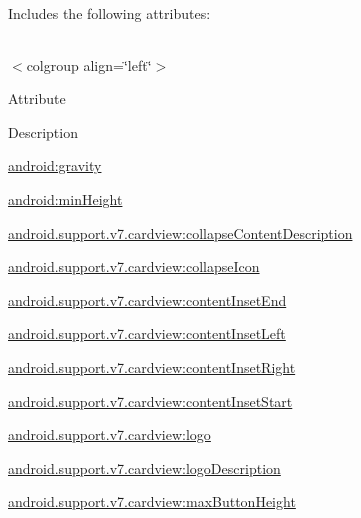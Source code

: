 Includes the following attributes\+:

\tabulinesep=1mm
\begin{longtabu} spread 0pt [c]{*{0}{|X[-1]}|}
\hline
\end{longtabu}
$<$colgroup align=\char`\"{}left\char`\"{}$>$ 

Attribute

Description 

{\ttfamily \hyperlink{classandroid_1_1support_1_1v7_1_1cardview_1_1R_1_1styleable_a303e5186407298acc48895e58eb6f585}{android\+:gravity}}

{\ttfamily \hyperlink{classandroid_1_1support_1_1v7_1_1cardview_1_1R_1_1styleable_afbb49f332c51e210fbfa15d408af281d}{android\+:min\+Height}}

{\ttfamily \hyperlink{classandroid_1_1support_1_1v7_1_1cardview_1_1R_1_1styleable_a7f64c62bccb20000a1ce0dead70df1b9}{android.\+support.\+v7.\+cardview\+:collapse\+Content\+Description}}

{\ttfamily \hyperlink{classandroid_1_1support_1_1v7_1_1cardview_1_1R_1_1styleable_a8eb012775ab40a813cfab4b5965dbc11}{android.\+support.\+v7.\+cardview\+:collapse\+Icon}}

{\ttfamily \hyperlink{classandroid_1_1support_1_1v7_1_1cardview_1_1R_1_1styleable_a7b083162c37953ab9198af4e458c5c85}{android.\+support.\+v7.\+cardview\+:content\+Inset\+End}}

{\ttfamily \hyperlink{classandroid_1_1support_1_1v7_1_1cardview_1_1R_1_1styleable_afa00957dff7d0d6a25908e2bb3a2b56c}{android.\+support.\+v7.\+cardview\+:content\+Inset\+Left}}

{\ttfamily \hyperlink{classandroid_1_1support_1_1v7_1_1cardview_1_1R_1_1styleable_a9029bc8fbf941277cd67da6b7fd92668}{android.\+support.\+v7.\+cardview\+:content\+Inset\+Right}}

{\ttfamily \hyperlink{classandroid_1_1support_1_1v7_1_1cardview_1_1R_1_1styleable_ac1839a6fcec9ba5ef65e542846ca28a7}{android.\+support.\+v7.\+cardview\+:content\+Inset\+Start}}

{\ttfamily \hyperlink{classandroid_1_1support_1_1v7_1_1cardview_1_1R_1_1styleable_ac5bdebe83f2a68287e8ab3f0ddb5920c}{android.\+support.\+v7.\+cardview\+:logo}}

{\ttfamily \hyperlink{classandroid_1_1support_1_1v7_1_1cardview_1_1R_1_1styleable_a8faae4fbd9959da0d13b10544ea5be98}{android.\+support.\+v7.\+cardview\+:logo\+Description}}

{\ttfamily \hyperlink{classandroid_1_1support_1_1v7_1_1cardview_1_1R_1_1styleable_a26e906d28bad0693208a7f57617b8316}{android.\+support.\+v7.\+cardview\+:max\+Button\+Height}}

